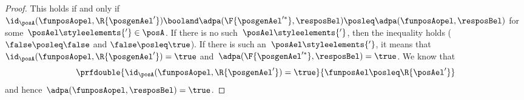 \begin{proof}
    This holds if and only if~$\id_\posA(\funposAopel,\R{\posgenAel'})\booland \adpa(\F{\posgenAel'^*},\resposBel) \posleq \adpa(\funposAopel,\resposBel)$ for some~$\posAel\styleelements{'}\in \posA$.
    If there is no such~$\posAel\styleelements{'}$, then the inequality holds ($\false \posleq \false$ and $\false \posleq \true$).
    If there is such an~$\posAel\styleelements{'}$, it means that~$\id_\posA(\funposAopel,\R{\posgenAel'})=\true$ and~$\adpa(\F{\posgenAel'^*},\resposBel)=\true$.
    We know that
    \begin{equation*}
        \prfdouble{\id_\posA(\funposAopel,\R{\posgenAel'})=\true}{\funposAel \posleq \R{\posAel'}}
    \end{equation*}
    and hence~$\adpa(\funposAopel,\resposBel)=\true$.
\end{proof}
